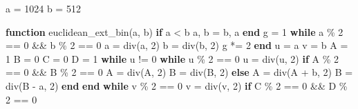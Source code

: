 \documentclass[
]{article}
\newenvironment{Shaded}{}{}
\newcommand{\ControlFlowTok}[1]{\textcolor[rgb]{0.00,0.44,0.13}{\textbf{#1}}}
\newcommand{\FloatTok}[1]{\textcolor[rgb]{0.25,0.63,0.44}{#1}}
\newcommand{\FunctionTok}[1]{\textcolor[rgb]{0.02,0.16,0.49}{#1}}
\newcommand{\KeywordTok}[1]{\textcolor[rgb]{0.00,0.44,0.13}{\textbf{#1}}}
\newcommand{\NormalTok}[1]{#1}
\newcommand{\OperatorTok}[1]{\textcolor[rgb]{0.40,0.40,0.40}{#1}}
\begin{document}
\begin{Shaded}
\begin{Highlighting}[]
\NormalTok{a }\OperatorTok{=} \FloatTok{1024}
\NormalTok{b }\OperatorTok{=} \FloatTok{512}

\KeywordTok{function} \FunctionTok{euclidean\_ext\_bin}\NormalTok{(a, b)}
    \ControlFlowTok{if}\NormalTok{ a }\OperatorTok{\textless{}}\NormalTok{ b}
\NormalTok{        a, b }\OperatorTok{=}\NormalTok{ b, a}
    \ControlFlowTok{end}
\NormalTok{    g }\OperatorTok{=} \FloatTok{1}
    \ControlFlowTok{while}\NormalTok{ a }\OperatorTok{\%} \FloatTok{2} \OperatorTok{==} \FloatTok{0} \OperatorTok{\&\&}\NormalTok{ b }\OperatorTok{\%} \FloatTok{2} \OperatorTok{==} \FloatTok{0}
\NormalTok{        a }\OperatorTok{=} \FunctionTok{div}\NormalTok{(a, }\FloatTok{2}\NormalTok{)}
\NormalTok{        b }\OperatorTok{=} \FunctionTok{div}\NormalTok{(b, }\FloatTok{2}\NormalTok{)}
\NormalTok{        g }\OperatorTok{*=} \FloatTok{2}
    \ControlFlowTok{end}
\NormalTok{    u }\OperatorTok{=}\NormalTok{ a}
\NormalTok{    v }\OperatorTok{=}\NormalTok{ b}
\NormalTok{    A }\OperatorTok{=} \FloatTok{1}
\NormalTok{    B }\OperatorTok{=} \FloatTok{0}
\NormalTok{    C }\OperatorTok{=} \FloatTok{0}
\NormalTok{    D }\OperatorTok{=} \FloatTok{1}
    \ControlFlowTok{while}\NormalTok{ u }\OperatorTok{!=} \FloatTok{0}
        \ControlFlowTok{while}\NormalTok{ u }\OperatorTok{\%} \FloatTok{2} \OperatorTok{==} \FloatTok{0}
\NormalTok{            u }\OperatorTok{=} \FunctionTok{div}\NormalTok{(u, }\FloatTok{2}\NormalTok{)}
            \ControlFlowTok{if}\NormalTok{ A }\OperatorTok{\%} \FloatTok{2} \OperatorTok{==} \FloatTok{0} \OperatorTok{\&\&}\NormalTok{ B }\OperatorTok{\%} \FloatTok{2} \OperatorTok{==} \FloatTok{0}
\NormalTok{                A }\OperatorTok{=} \FunctionTok{div}\NormalTok{(A, }\FloatTok{2}\NormalTok{)}
\NormalTok{                B }\OperatorTok{=} \FunctionTok{div}\NormalTok{(B, }\FloatTok{2}\NormalTok{)}
            \ControlFlowTok{else}
\NormalTok{                A }\OperatorTok{=} \FunctionTok{div}\NormalTok{(A }\OperatorTok{+}\NormalTok{ b, }\FloatTok{2}\NormalTok{)}
\NormalTok{                B }\OperatorTok{=} \FunctionTok{div}\NormalTok{(B }\OperatorTok{{-}}\NormalTok{ a, }\FloatTok{2}\NormalTok{)}
            \ControlFlowTok{end}
        \ControlFlowTok{end}
        \ControlFlowTok{while}\NormalTok{ v }\OperatorTok{\%} \FloatTok{2} \OperatorTok{==} \FloatTok{0}
\NormalTok{            v }\OperatorTok{=} \FunctionTok{div}\NormalTok{(v, }\FloatTok{2}\NormalTok{)}
            \ControlFlowTok{if}\NormalTok{ C }\OperatorTok{\%} \FloatTok{2} \OperatorTok{==} \FloatTok{0} \OperatorTok{\&\&}\NormalTok{ D }\OperatorTok{\%} \FloatTok{2} \OperatorTok{==} \FloatTok{0}

\end{Highlighting}
\end{Shaded}
\end{document}
